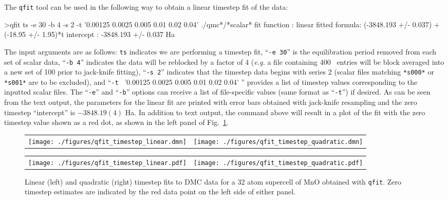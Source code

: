 The \texttt{qfit} tool can be used in the following way to obtain
a linear timestep fit of the data:
\begin{shade}
>qfit ts -e 30 -b 4 -s 2 -t '0.00125 0.0025 0.005 0.01 0.02 0.04' ./qmc*/*scalar*
fit function  : linear
fitted formula: (-3848.193 +/- 0.037) + (-18.95 +/- 1.95)*t
intercept     : -3848.193 +/- 0.037  Ha
\end{shade}
The input arguments are as follows: \texttt{ts} indicates we are
performing a timestep fit, ``\texttt{-e 30}'' is the equilibration period
removed from each set of scalar data, ``\texttt{-b 4}'' indicates the data
will be reblocked by a factor of 4 (\emph{e.g.} a file containing 400 \
entries will be block averaged into a new set of 100 prior to jack-knife
fitting), ``\texttt{-s 2}'' indicates that the timestep data begins with
series 2 (scalar files matching \texttt{*s000*} or \texttt{*s001*} are
to be excluded), and ``\texttt{-t } '0.00125 0.0025 0.005 0.01 0.02 0.04' ''
provides a list of timestep values corresponding to the inputted scalar
files.  The ``\texttt{-e}'' and ``\texttt{-b}'' options can receive a
list of file-specific values (same format as ``\texttt{-t}'') if desired.
As can be seen from the text output, the parameters for the linear fit
are printed with error bars obtained with jack-knife resampling and
the zero timestep ``intercept'' is $-3848.19(4)$ Ha.  In addition to
text output, the command above will result in a plot of the fit with
the zero timestep value shown as a red dot, as shown in the left
panel of Fig.~\ref{fig:qfit_timestep}.

\begin{figure}
  \centering
\ifdefined\HCode%
  \begin{tabularx}{1024pt}{X X}
    \texttt{[image: ./figures/qfit\_timestep\_linear.dmn]}&
    \texttt{[image: ./figures/qfit\_timestep\_quadratic.dmn]}\\
  \end{tabularx}
\else%
  \begin{tabularx}{\textwidth}{X X}
    \texttt{[image: ./figures/qfit\_timestep\_linear.pdf]}&
    \texttt{[image: ./figures/qfit\_timestep\_quadratic.pdf]}\\
    \end{tabularx}
\fi%
\caption{Linear (left) and quadratic (right) timestep fits to DMC data for a 32 atom supercell of MnO obtained with \texttt{qfit}.  Zero timestep estimates are indicated by the red data point on the left side of either panel.}
  \label{fig:qfit_timestep}
\end{figure}

